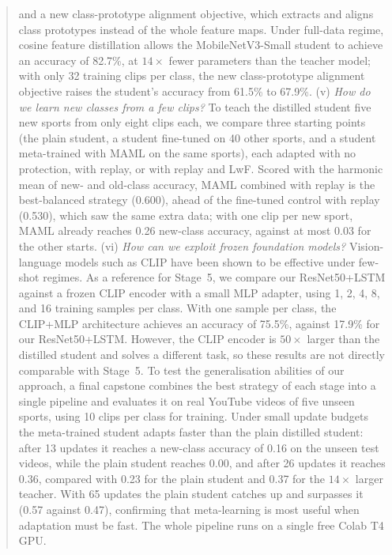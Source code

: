 \documentclass[conference]{IEEEtran}
\begin{document}
\begin{abstract}
and a new class-prototype alignment objective, which extracts and aligns class prototypes instead of the whole feature maps.
Under full-data regime, cosine feature distillation allows the MobileNetV3-Small student
to achieve an accuracy of 82.7\%, at $14\times$ fewer parameters than the teacher model; with only 32 training clips per class, 
the new class-prototype alignment objective raises the student's accuracy from 61.5\% to 67.9\%. 
(v) \emph{How do we learn new classes from a few clips?}
To teach the distilled student five new sports from only eight clips each, we compare three starting points
(the plain student, a student fine-tuned on 40 other sports, and a student meta-trained with MAML on the same
sports), each adapted with no protection, with replay, or with replay and LwF. Scored with the harmonic mean of
new- and old-class accuracy, MAML combined with replay is the best-balanced strategy (0.600), ahead of the
fine-tuned control with replay (0.530), which saw the same extra data; with one clip per new sport, MAML already
reaches 0.26 new-class accuracy, against at most 0.03 for the other starts.
(vi) \emph{How can we exploit frozen foundation models?} Vision-language models such as CLIP have been shown to be effective
under few-shot regimes. As a reference for Stage~5, we compare our ResNet50+LSTM against a frozen CLIP encoder with a small
MLP adapter, using 1, 2, 4, 8, and 16 training samples per class. With one sample per class, the CLIP+MLP architecture
achieves an accuracy of 75.5\%, against 17.9\% for our ResNet50+LSTM. However, the CLIP encoder is $50\times$ larger than
the distilled student and solves a different task, so these results are not directly comparable with Stage~5.
To test the generalisation abilities of our approach, a final capstone combines the best strategy of each stage into a
single pipeline and evaluates it on real YouTube videos of five unseen sports, using 10 clips per class for training.
Under small update budgets the meta-trained student adapts faster than the plain distilled student: after 13 updates
it reaches a new-class accuracy of 0.16 on the unseen test videos, while the plain student reaches 0.00, and after 26
updates it reaches 0.36, compared with 0.23 for the plain student and 0.37 for the $14\times$ larger teacher. With 65
updates the plain student catches up and surpasses it (0.57 against 0.47), confirming that meta-learning is most useful
when adaptation must be fast.
The whole pipeline runs on a single free Colab T4 GPU.
\end{abstract}
\end{document}
